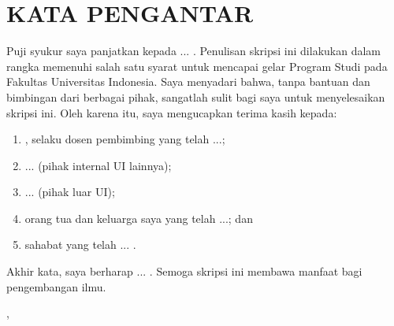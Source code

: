 \chapter*{KATA PENGANTAR}

Puji syukur saya panjatkan kepada ... . Penulisan skripsi ini dilakukan dalam
rangka memenuhi salah satu syarat untuk mencapai gelar \thegelar{} Program Studi
\theprodi{} pada Fakultas \thefakultas{} Universitas Indonesia. Saya menyadari bahwa,
tanpa bantuan dan bimbingan dari berbagai pihak, sangatlah sulit bagi saya untuk
menyelesaikan skripsi ini. Oleh karena itu, saya mengucapkan terima kasih kepada:
\begin{enumerate}
  \item \thepembimbing, selaku dosen pembimbing yang telah ...;
  \item ... (pihak internal UI lainnya);
  \item ... (pihak luar UI);
  \item orang tua dan keluarga saya yang telah ...; dan
  \item sahabat yang telah ... .
\end{enumerate}

Akhir kata, saya berharap ... . Semoga skripsi ini membawa manfaat bagi
pengembangan ilmu.

\vspace{1cm}
\begin{flushright}
\thekota, \thetanggalsidang\\[1.5cm]
\thenama
\end{flushright}
